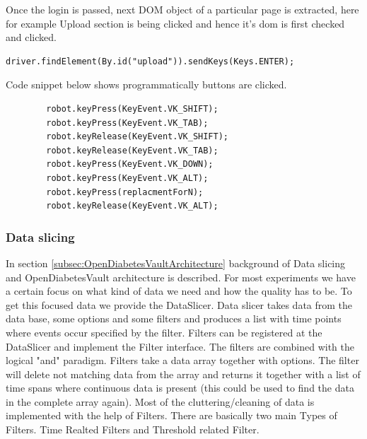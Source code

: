\documentclass[article,type=msc,colorback,accentcolor=tud9c,twoside,11pt]{tudthesis}
\begin{document}
Once the login is passed, next DOM object of a particular page is extracted, here for example Upload section is being clicked and hence it's dom is first checked and clicked.
\begin{lstlisting}
driver.findElement(By.id("upload")).sendKeys(Keys.ENTER);
\end{lstlisting}
 Code snippet below shows programmatically buttons are clicked.
\begin{lstlisting}
		robot.keyPress(KeyEvent.VK_SHIFT);
		robot.keyPress(KeyEvent.VK_TAB);
		robot.keyRelease(KeyEvent.VK_SHIFT);
		robot.keyRelease(KeyEvent.VK_TAB);
		robot.keyPress(KeyEvent.VK_DOWN);
		robot.keyPress(KeyEvent.VK_ALT);
		robot.keyPress(replacmentForN);
		robot.keyRelease(KeyEvent.VK_ALT);	
\end{lstlisting}


\subsubsection{Data slicing}
In section \ref{subsec:OpenDiabetesVaultArchitecture} background of Data slicing and OpenDiabetesVault architecture is described. For most experiments we have a certain focus on what kind of data we need and how the quality has to be. To get this focused data we provide the DataSlicer. Data slicer takes data from the data base, some options and some filters and produces a list with time points where events occur specified by the filter. Filters can be registered at the DataSlicer and implement the Filter interface. The filters are combined with the logical "and" paradigm. Filters take a data array together with options. The filter will delete not matching data from the array and returns it together with a list of time spans where continuous data is present (this could be used to find the data in the complete array again).  Most of the cluttering/cleaning of data is implemented with the help of Filters. There are basically two main Types of Filters. Time Realted Filters and Threshold related Filter.
\end{document}
